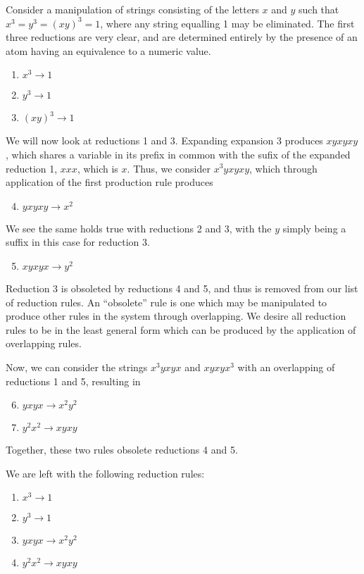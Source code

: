 \begin{example}
	Consider a manipulation of strings consisting of the letters $x$ and $y$ such that $x^3=y^3=(xy)^3=1$, where any string equalling 1 may be eliminated. The first three reductions are very clear, and are determined entirely by the presence of an atom having an equivalence to a numeric value.
	\begin{enumerate}
		\item $x^3 \rightarrow 1$
		\item $y^3 \rightarrow 1$
		\item $(xy)^3 \rightarrow 1$
	\end{enumerate}
	We will now look at reductions 1 and 3. Expanding expansion 3 produces $xyxyxy$, which shares a variable in its prefix in common with the sufix of the expanded reduction 1, $xxx$, which is $x$. Thus, we consider $x^3yxyxy$, which through application of the first production rule produces 
	\begin{enumerate}
		\setcounter{enumi}{3}
		\item $yxyxy \rightarrow x^2$
	\end{enumerate}
	We see the same holds true with reductions 2 and 3, with the $y$ simply being a suffix in this case for reduction 3.
	\begin{enumerate}
		\setcounter{enumi}{4}
		\item $xyxyx \rightarrow y^2$
	\end{enumerate}
	Reduction 3 is obsoleted by reductions 4 and 5, and thus is removed from our list of reduction rules. An ``obsolete'' rule is one which may be manipulated to produce other rules in the system through overlapping. We desire all reduction rules to be in the least general form which can be produced by the application of overlapping rules.

	Now, we can consider the strings $x^3yxyx$ and $xyxyx^3$ with an overlapping of reductions 1 and 5, resulting in
	\begin{enumerate}
		\setcounter{enumi}{5}
		\item $yxyx \rightarrow x^2y^2$
		\item $y^2x^2 \rightarrow xyxy$
	\end{enumerate}
	Together, these two rules obsolete reductions 4 and 5.	

	We are left with the following reduction rules:
	\begin{enumerate}
		\item $x^3 \rightarrow 1$
		\item $y^3 \rightarrow 1$
		\item $yxyx \rightarrow x^2y^2$
		\item $y^2x^2 \rightarrow xyxy$
	\end{enumerate}

\end{example}

